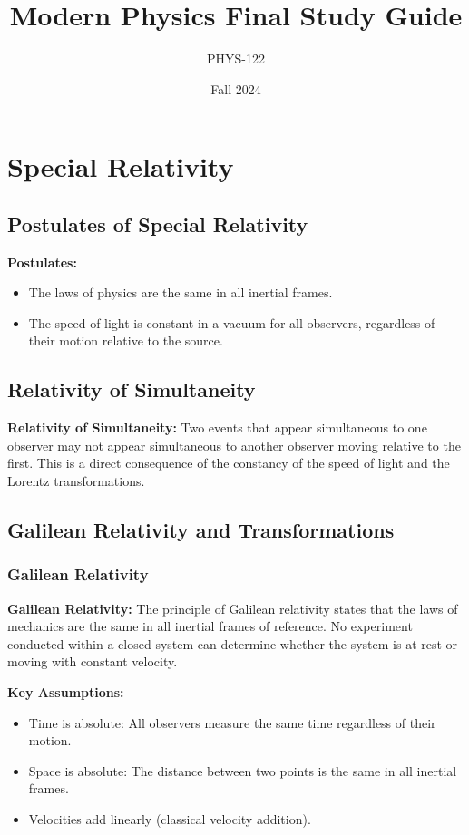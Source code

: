 \documentclass{article}
\title{Modern Physics Final Study Guide}
\author{PHYS-122}
\date{Fall 2024}
\newcommand{\conceptbox}[1]{\begin{tcolorbox}[colback=blue!10] #1 \end{tcolorbox}}
\begin{document}
\maketitle

\newpage

\tableofcontents

\newpage

\section{Special Relativity}

\subsection{Postulates of Special Relativity}
\conceptbox{
\textbf{Postulates:}
\begin{itemize}
    \item The laws of physics are the same in all inertial frames.
    \item The speed of light is constant in a vacuum for all observers, regardless of their motion relative to the source.
\end{itemize}
}

\subsection{Relativity of Simultaneity}
\conceptbox{
\textbf{Relativity of Simultaneity:}
Two events that appear simultaneous to one observer may not appear simultaneous to another observer moving relative to the first. This is a direct consequence of the constancy of the speed of light and the Lorentz transformations.
}

\subsection{Galilean Relativity and Transformations}

\subsubsection{Galilean Relativity}
\conceptbox{
\textbf{Galilean Relativity:}
The principle of Galilean relativity states that the laws of mechanics are the same in all inertial frames of reference. No experiment conducted within a closed system can determine whether the system is at rest or moving with constant velocity.

\textbf{Key Assumptions:}
\begin{itemize}
    \item Time is absolute: All observers measure the same time regardless of their motion.
    \item Space is absolute: The distance between two points is the same in all inertial frames.
    \item Velocities add linearly (classical velocity addition).
\end{itemize}
}
\end{document}

